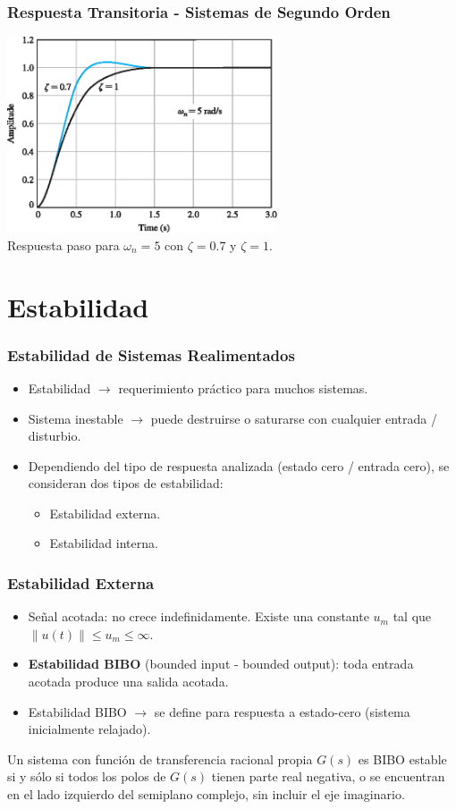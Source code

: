 \documentclass[aspectratio=169,handout]{beamer}
\newcommand{\norm}[1]{\left\lVert#1\right\rVert}
\theoremstyle{definition}
\theoremstyle{plain}
\theoremstyle{remark}
\begin{document}
\begin{frame}[<-+>]\frametitle{Respuesta Transitoria - Sistemas de Segundo Orden}
\vspace*{3mm}
\centering
\includegraphics[width=8cm]{images/secondOrderResponseSameOmega.eps}\\
Respuesta paso para $\omega_n = 5$ con $\zeta = 0.7$ y $\zeta = 1$.
\end{frame}

\section{Estabilidad}
\begin{frame}[<-+>]\frametitle{Estabilidad de Sistemas Realimentados}
\begin{itemize}
  \item Estabilidad $\rightarrow$ requerimiento práctico para muchos sistemas.
  \item Sistema inestable $\rightarrow$ puede destruirse o saturarse con cualquier entrada / disturbio.
  \item Dependiendo del tipo de respuesta analizada (estado cero / entrada cero), se consideran dos tipos de estabilidad:
  \begin{itemize}
    \item Estabilidad externa.
    \item Estabilidad interna.
  \end{itemize}
\end{itemize}
\end{frame}

\begin{frame}[<-+>]\frametitle{Estabilidad Externa}
  \begin{itemize}
    \item Señal acotada: no crece indefinidamente. Existe una constante $u_m$ tal que $\norm{u(t)} \leq u_m \leq \infty$.
    \item \textbf{Estabilidad BIBO} (bounded input - bounded output): toda entrada acotada produce una salida acotada.
    \item Estabilidad BIBO $\rightarrow$ se define para respuesta a estado-cero (sistema inicialmente relajado).
  \end{itemize}
  \begin{theorem}
    Un sistema con función de transferencia racional propia $G(s)$ es BIBO estable si y sólo si todos los polos de $G(s)$ tienen parte real negativa, o se encuentran en el lado izquierdo del semiplano complejo, sin incluir el eje imaginario.
  \end{theorem}
\end{frame}
\end{document}
